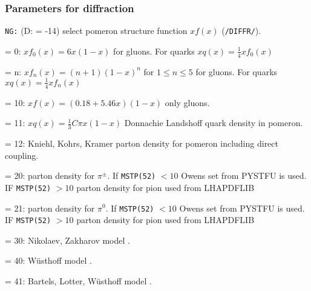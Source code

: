 \documentclass[10pt]{article} \usepackage{dina4}
\newcommand{\LHAPDFLIB}{Whalley:2005nh}
\newcommand{\deflab}[1]{#1\hfil}%
\newenvironment{defl}[1]%
  {\begin{list}{}{\settowidth{\labelwidth}{#1}%
  \setlength{\leftmargin}{\labelwidth}%
  \addtolength{\leftmargin}{\labelsep}%
  \setlength{\itemsep}{0pt plus 1pt}
  \setlength{\parsep}{0pt plus 1pt}
  \setlength{\topsep}{0pt plus 1pt}
  \setlength{\partopsep}{0pt plus 1pt}
  \setlength{\parskip}{2mm plus 1mm minus 1mm}
  \let\makelabel\deflab}}%
  {\end{list}}
\begin{document}
\subsubsection{Parameters for diffraction}

\begin{defl}{123456789012345}
\item[{\tt NG:}] (D: = -14) select pomeron structure 
                        function
                        $xf(x)$ (\verb+/DIFFR/+). 
\item[]
                        = 0:  $xf_0(x)= 6x(1-x)$ for gluons. For quarks 
                        $xq(x) =\frac{1}{4} xf_0(x)$
\item[]
                        = n:  $xf_n(x)= (n+1)(1-x)^n$
                              for $1 \leq n \leq 5$ for gluons. For quarks 
                        $xq(x) =\frac{1}{4} xf_n(x)$
\item[]                 = 10: $xf(x) = (0.18 + 5.46x)(1-x)$ only gluons.
\item[]
                        = 11:  $xq(x) = \frac{1}{3}C\pi x(1-x)$
                             Donnachie Landshoff quark density in
                             pomeron.
\item[]
                        = 12: Kniehl, Kohrs, Kramer parton density
                             \cite{Kohrsa,Kohrsb} for
                             pomeron including direct coupling. 
\item[]
                        = 20: parton density for $\pi ^{\pm}$.
                              If \verb+MSTP(52)+ $ < 10 $ 
                               Owens set from PYSTFU is used.
                              IF \verb+MSTP(52)+ $ > 10 $ 
                              parton density for pion used
                              from LHAPDFLIB 
                             \cite{\LHAPDFLIB} 
\item[]
                        = 21: parton density for $\pi ^0$.
                              If \verb+MSTP(52)+ $ < 10 $ 
                              Owens set from PYSTFU is used.
                              IF \verb+MSTP(52)+ $ > 10 $ 
                              parton density for pion used
                              from LHAPDFLIB 
\item[] = 30: Nikolaev, Zakharov model \cite{NikZak}.
\item[] = 40: W\"usthoff model \cite{Wusthoff}.
\item[] = 41: Bartels, Lotter, W\"usthoff model 
                              \cite{Bartels_jets,Bartels_asym}.

\end{defl}
\end{document}

